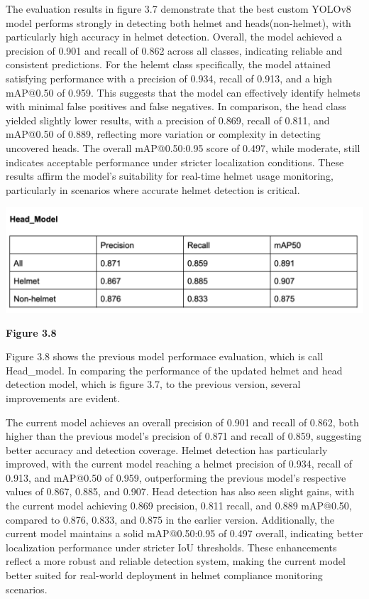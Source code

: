 \noindent\hspace{2.5em}The evaluation results in figure 3.7 demonstrate that the best custom YOLOv8 model performs strongly in detecting both helmet and heads(non-helmet), with particularly high accuracy in helmet detection. Overall, the model achieved a precision of 0.901 and recall of 0.862 across all classes, indicating reliable and consistent predictions. For the helemt class specifically, the model attained satisfying performance with a precision of 0.934, recall of 0.913, and a high mAP@0.50 of 0.959. This suggests that the model can effectively identify helmets with minimal false positives and false negatives. In comparison, the head class yielded slightly lower results, with a precision of 0.869, recall of 0.811, and mAP@0.50 of 0.889, reflecting more variation or complexity in detecting uncovered heads. The overall mAP@0.50:0.95 score of 0.497, while moderate, still indicates acceptable performance under stricter localization conditions. These results affirm the model’s suitability for real-time helmet usage monitoring, particularly in scenarios where accurate helmet detection is critical.

\begin{center}
	\includegraphics[width=1\textwidth]{performance.eva2.png}
	
	\vspace{0.5em}
	\textbf{Figure 3.8}
\end{center}
\noindent\hspace{2.5em}Figure 3.8 shows the previous model performace evaluation, which is call Head\_model. In comparing the performance of the updated helmet and head detection model, which is figure 3.7, to the previous version, several improvements are evident. 

\noindent\hspace{2.5em}The current model achieves an overall precision of 0.901 and recall of 0.862, both higher than the previous model’s precision of 0.871 and recall of 0.859, suggesting better accuracy and detection coverage. Helmet detection has particularly improved, with the current model reaching a helmet precision of 0.934, recall of 0.913, and mAP@0.50 of 0.959, outperforming the previous model’s respective values of 0.867, 0.885, and 0.907. Head detection has also seen slight gains, with the current model achieving 0.869 precision, 0.811 recall, and 0.889 mAP@0.50, compared to 0.876, 0.833, and 0.875 in the earlier version. Additionally, the current model maintains a solid mAP@0.50:0.95 of 0.497 overall, indicating better localization performance under stricter IoU thresholds. These enhancements reflect a more robust and reliable detection system, making the current model better suited for real-world deployment in helmet compliance monitoring scenarios.